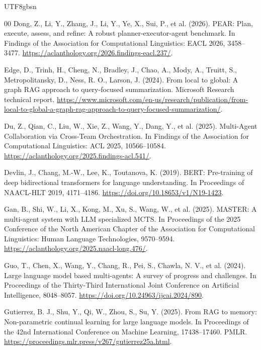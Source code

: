 \documentclass[a4paper,fleqn]{cas-sc}
\begin{document}
\begin{CJK*}{UTF8}{gbsn}
\begin{thebibliography}{00}
Dong, Z., Li, Y., Zhang, J., Li, Y., Ye, X., Sui, P., et al. (2026). PEAR: Plan, execute, assess, and refine: A robust planner-executor-agent benchmark. In Findings of the Association for Computational Linguistics: EACL 2026, 3458--3477. \url{https://aclanthology.org/2026.findings-eacl.237/}.

Edge, D., Trinh, H., Cheng, N., Bradley, J., Chao, A., Mody, A., Truitt, S., Metropolitansky, D., Ness, R. O., Larson, J. (2024). From local to global: A graph RAG approach to query-focused summarization. Microsoft Research technical report. \url{https://www.microsoft.com/en-us/research/publication/from-local-to-global-a-graph-rag-approach-to-query-focused-summarization/}.

Du, Z., Qian, C., Liu, W., Xie, Z., Wang, Y., Dang, Y., et al. (2025). Multi-Agent Collaboration via Cross-Team Orchestration. In Findings of the Association for Computational Linguistics: ACL 2025, 10566--10584. \url{https://aclanthology.org/2025.findings-acl.541/}.

Devlin, J., Chang, M.-W., Lee, K., Toutanova, K. (2019). BERT: Pre-training of deep bidirectional transformers for language understanding. In Proceedings of NAACL-HLT 2019, 4171--4186. \url{https://doi.org/10.18653/v1/N19-1423}.

Gan, B., Shi, W., Li, X., Kong, M., Xu, S., Wang, W., et al. (2025). MASTER: A multi-agent system with LLM specialized MCTS. In Proceedings of the 2025 Conference of the North American Chapter of the Association for Computational Linguistics: Human Language Technologies, 9570--9594. \url{https://aclanthology.org/2025.naacl-long.476/}.

Guo, T., Chen, X., Wang, Y., Chang, R., Pei, S., Chawla, N. V., et al. (2024). Large language model based multi-agents: A survey of progress and challenges. In Proceedings of the Thirty-Third International Joint Conference on Artificial Intelligence, 8048--8057. \url{https://doi.org/10.24963/ijcai.2024/890}.

Gutierrez, B. J., Shu, Y., Qi, W., Zhou, S., Su, Y. (2025). From RAG to memory: Non-parametric continual learning for large language models. In Proceedings of the 42nd International Conference on Machine Learning, 17438--17460. PMLR. \url{https://proceedings.mlr.press/v267/gutierrez25a.html}.


\end{thebibliography}
\end{CJK*}
\end{document}
